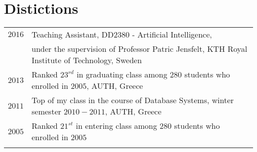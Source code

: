 \documentclass[a4paper,10pt,twoside]{article}
\begin{document}

\section{Distictions}
\begin{tabular}{rl}

$2016$ & Teaching Assistant, DD2380 - Artificial Intelligence, \\ & under the
supervision of Professor Patric Jensfelt, KTH Royal Institute of Technology, Sweden \\


$2013$ & Ranked $23^{rd}$ in graduating class among $280$ students who enrolled in $2005$,
AUTH, Greece \\


$2011$ & Top of my class in the course of Database Systems, winter semester $2010 - 2011$,
AUTH, Greece \\


$2005$ & Ranked $21^{st}$ in entering class among $280$ students who enrolled in $2005$\\
&\\
\end{tabular}






\end{document}
